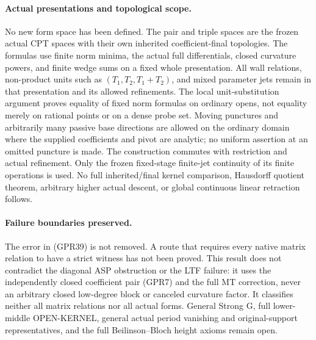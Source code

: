 \paragraph{Actual presentations and topological scope.}
No new form space has been defined.  The pair and triple spaces
are the frozen actual CPT spaces with their own inherited
coefficient-final topologies.  The formulas use finite norm
minima, the actual full differentials, closed curvature powers,
and finite wedge sums on a fixed whole presentation.  All wall
relations, non-product units such as $(T_1,T_2,T_1+T_2)$, and
mixed parameter jets remain in that presentation and its allowed
refinements.  The local unit-substitution argument proves equality
of fixed norm formulas on ordinary opens, not equality merely on
rational points or on a dense probe set.  Moving punctures and
arbitrarily many passive base directions are allowed on the
ordinary domain where the supplied coefficients and pivot are
analytic; no uniform assertion at an omitted puncture is made.
The construction commutes with restriction and actual refinement.
Only the frozen fixed-stage finite-jet continuity of its finite
operations is used.  No full inherited/final kernel comparison,
Hausdorff quotient theorem, arbitrary higher actual descent, or
global continuous linear retraction follows.

\paragraph{Failure boundaries preserved.}
The error in (GPR39) is not removed.  A route that requires every
native matrix relation to have a strict witness has not been
proved.  This result does not contradict the diagonal ASP
obstruction or the LTF failure: it uses the independently closed
coefficient pair (GPR7) and the full MT correction, never an
arbitrary closed low-degree block or canceled curvature factor.
It classifies neither all matrix relations nor all actual forms.
General Strong G, full lower-middle OPEN-KERNEL, general actual
period vanishing and original-support representatives, and the
full Beilinson--Bloch height axioms remain open.

